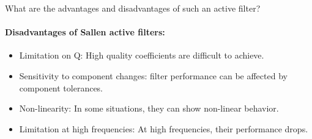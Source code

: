 \documentclass[11pt]{article}
\begin{document}
\begin{question}
\begin{subquestion}{What are the advantages and disadvantages of such an active filter?}
{            \paragraph*{Disadvantages of Sallen active filters:}
            \begin{itemize}
                \item Limitation on Q: High quality coefficients are difficult to achieve.
                \item Sensitivity to component changes: filter performance can be affected by component tolerances.
                \item Non-linearity: In some situations, they can show non-linear behavior.
                \item Limitation at high frequencies: At high frequencies, their performance drops.
            \end{itemize}
        }
    \end{subquestion}

\end{question}
\end{document}
